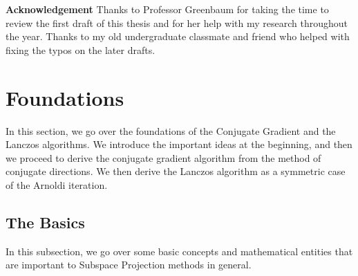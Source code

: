 \documentclass[]{article}
\theoremstyle{definition}
\begin{document}
    \newpage
\begin{center}\large
    \textbf{Acknowledgement}
    Thanks to Professor Greenbaum for taking the time to review the first draft of this thesis and for her help with my research throughout the year. Thanks to my old undergraduate classmate and friend who helped with fixing the typos on the later drafts. 
\end{center}


\newpage
\section{Foundations}
    In this section, we go over the foundations of the Conjugate Gradient and the Lanczos algorithms. We introduce the important ideas at the beginning, and then we proceed to derive the conjugate gradient algorithm from the method of conjugate directions.  We then derive the Lanczos algorithm as a symmetric case of the Arnoldi iteration. 
    \subsection{The Basics}
        In this subsection, we go over some basic concepts and mathematical entities that are important to Subspace Projection methods in general. 
\end{document}
